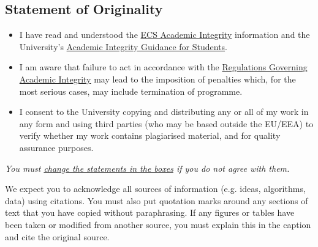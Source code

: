     
    \begin{center}
        \section*{Statement of Originality}
    \end{center}
    {
        \thispagestyle{plain}
        \hypersetup{urlcolor = black}
        
        \begin{itemize}[leftmargin=1.5em, labelindent=1em]
            \item 
                I have read and understood the \href{http://ecs.gg/ai}{ECS Academic Integrity} information and the University’s \href{https://www.southampton.ac.uk/quality/assessment/academic_integrity.page}{Academic Integrity Guidance for Students}.
            \item 
                I am aware that failure to act in accordance with the \href{http://www.calendar.soton.ac.uk/sectionIV/academic-integrity-regs.html}{Regulations Governing Academic Integrity} may lead to the imposition of penalties which, for the most serious cases, may include termination of programme.
            \item 
                I consent to the University copying and distributing any or all of my work in any form and using third parties (who may be based outside the EU/EEA) to verify whether my work contains plagiarised material, and for quality assurance purposes.
        \end{itemize}
        
        \vspace{-0.5em}
        \textit{You must \underline{change the statements in the boxes} if you do not agree with them.}
        
        We expect you to acknowledge all sources of information (e.g. ideas, algorithms, data) using citations. You must also put quotation marks around any sections of text that you have copied without paraphrasing. If any figures or tables have been taken or modified from another source, you must explain this in the caption and cite the original source.
        
        \noindent{}
        
}
